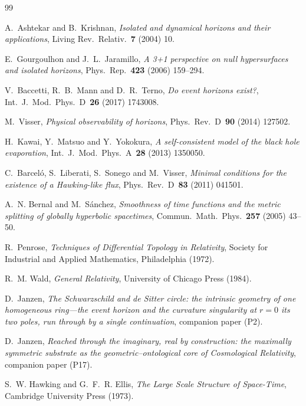 \documentclass[11pt,a4paper]{article}
\theoremstyle{plain}
\theoremstyle{remark}
\begin{document}
\begin{thebibliography}{99}

A.~Ashtekar and B.~Krishnan,
\emph{Isolated and dynamical horizons and their applications},
Living Rev.~Relativ.~\textbf{7} (2004) 10.

E.~Gourgoulhon and J.~L.~Jaramillo,
\emph{A 3+1 perspective on null hypersurfaces and isolated horizons},
Phys.~Rep.~\textbf{423} (2006) 159--294.

V.~Baccetti, R.~B.~Mann and D.~R.~Terno,
\emph{Do event horizons exist?},
Int.~J.~Mod.~Phys.~D~\textbf{26} (2017) 1743008.

M.~Visser,
\emph{Physical observability of horizons},
Phys.~Rev.~D~\textbf{90} (2014) 127502.

H.~Kawai, Y.~Matsuo and Y.~Yokokura,
\emph{A self-consistent model of the black hole evaporation},
Int.~J.~Mod.~Phys.~A~\textbf{28} (2013) 1350050.

C.~Barcel\'o, S.~Liberati, S.~Sonego and M.~Visser,
\emph{Minimal conditions for the existence of a Hawking-like flux},
Phys.~Rev.~D~\textbf{83} (2011) 041501.

A.~N. Bernal and M.~Sánchez,
\emph{Smoothness of time functions and the metric splitting of globally hyperbolic spacetimes},
Commun.~Math.~Phys.~\textbf{257} (2005) 43--50.

R.~Penrose,
\emph{Techniques of Differential Topology in Relativity},
Society for Industrial and Applied Mathematics, Philadelphia (1972).

R.~M. Wald,
\emph{General Relativity},
University of Chicago Press (1984).

D.~Janzen,
\emph{The Schwarzschild and de Sitter circle: the intrinsic geometry of one homogeneous ring---the event horizon and the curvature singularity at $r=0$ its two poles, run through by a single continuation}, companion paper (P2).

D.~Janzen,
\emph{Reached through the imaginary, real by construction: the maximally symmetric substrate as the geometric--ontological core of Cosmological Relativity}, companion paper (P17).

S.~W. Hawking and G.~F.~R. Ellis,
\emph{The Large Scale Structure of Space-Time},
Cambridge University Press (1973).


\end{thebibliography}
\end{document}
